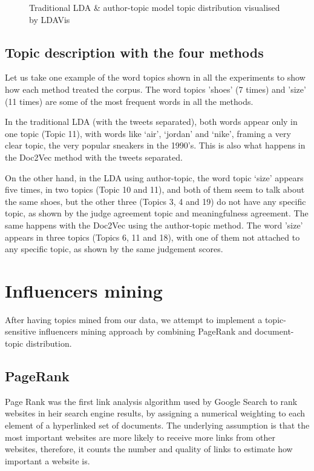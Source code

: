 \documentclass[11pt]{article}
\begin{document}
\begin{figure}[H]
    \caption{Traditional LDA \& author-topic model topic distribution visualised by LDAVis}
    \label{fig:res_trad_var}
\end{figure}

\subsection{Topic description with the four methods}

Let us take one example of the word topics shown in all the experiments to show how each method treated the corpus. The word topics 'shoes' (7 times) and 'size' (11 times) are some of the most frequent words in all the methods.   

In the traditional LDA (with the tweets separated), both words appear only in one topic (Topic 11), with words like `air', `jordan' and `nike', framing a very clear topic, the very popular sneakers in the 1990's. This is also what happens in the Doc2Vec method with the tweets separated.  

On the other hand, in the LDA using author-topic, the word topic `size' appears five times, in two topics (Topic 10 and 11), and both of them seem to talk about the same shoes, but the other three (Topics 3, 4 and 19) do not have any specific topic, as shown by the judge agreement topic and meaningfulness agreement. The same happens with the Doc2Vec using the author-topic method. The word 'size' appears in three topics (Topics 6, 11 and 18), with one of them not attached to any specific topic, as shown by the same judgement scores. 

\section{Influencers mining}

After having topics mined from our data, we attempt to implement a topic-sensitive influencers mining approach by combining PageRank and document-topic distribution.

\subsection{PageRank}
Page Rank was the first link analysis algorithm used by Google Search to rank websites in heir search engine results, by assigning a numerical weighting to each element of a hyperlinked set of documents. The underlying assumption is that the most important websites are more likely to receive more links from other websites, therefore, it counts the number and quality of links to estimate how important a website is.
\end{document}
